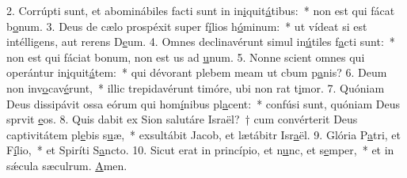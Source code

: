 2. Corrúpti sunt, et abominábiles facti sunt in in\uline{i}quit\uline{á}tibus:~* non est qui fácat b\uline{o}num.
3. Deus de cælo prospéxit super f\uline{í}lios h\uline{ó}minum:~* ut vídeat si est intélligens, aut rerens D\uline{e}um.
4. Omnes declinavérunt simul in\uline{ú}tiles f\uline{a}cti sunt:~* non est qui fáciat bonum, non est us ad \uline{u}num.
5. Nonne scient omnes qui operántur in\uline{i}quit\uline{á}tem:~* qui dévorant plebem meam ut cbum p\uline{a}nis?
6. Deum non inv\uline{o}cav\uline{é}runt,~* illic trepidavérunt timóre, ubi non rat t\uline{i}mor.
7. Quóniam Deus dissipávit ossa eórum qui hom\uline{í}nibus pl\uline{a}cent:~* confúsi sunt, quóniam Deus sprvit \uline{e}os.
8. Quis dabit ex Sion salutáre Israël?~† cum convérterit Deus captivitátem pl\uline{e}bis s\uline{u}æ,~* exsultábit Jacob, et lætábitr Isr\uline{a}ël.
9. Glória P\uline{a}tri, et F\uline{í}lio,~* et Spiríti S\uline{a}ncto.
10. Sicut erat in princípio, et n\uline{u}nc, et s\uline{e}mper,~* et in sǽcula sæculrum. \uline{A}men.
